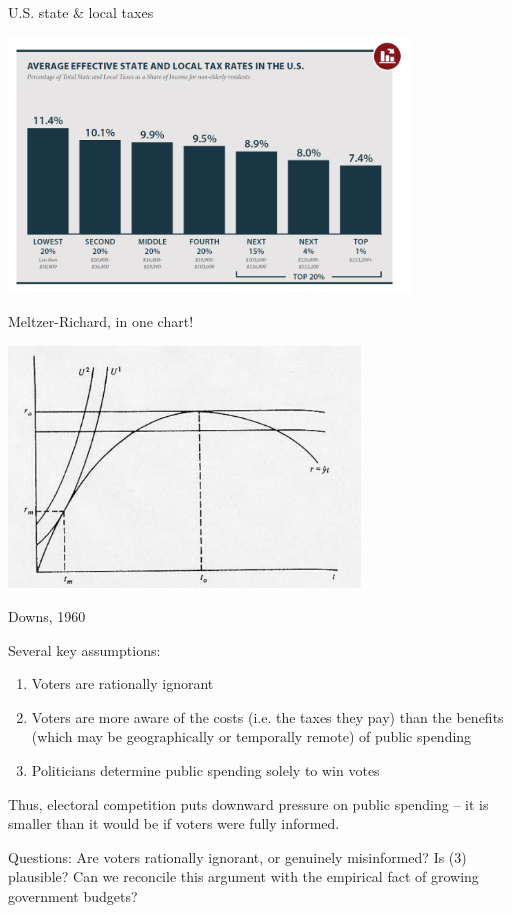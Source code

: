 \documentclass[aspectratio=169]{beamer}
\begin{document}
\begin{frame}{U.S. state \& local taxes}


\centering
\includegraphics[width=0.8\textwidth]{local_taxes.png}

\end{frame}
\begin{frame}{Meltzer-Richard, in one chart!}


\centering
\includegraphics[width=0.7\textwidth]{mr.png}

\end{frame}
\begin{frame}{Downs, 1960}

Several key assumptions:
\begin{enumerate}
\item Voters are \alert{rationally ignorant}
\pause 
\item Voters are more aware of the costs (i.e. the taxes they pay) than the benefits (which may be geographically or temporally remote) of public spending
\pause 
\item Politicians determine public spending solely to win votes
\end{enumerate}

\pause

Thus, electoral competition puts downward pressure on public spending -- it is smaller than it would be if voters were fully informed.

\pause

\begin{tcolorbox}
Questions: Are voters rationally ignorant, or genuinely misinformed? Is (3) plausible? Can we reconcile this argument with the empirical fact of growing government budgets?
\end{tcolorbox}

\end{frame}
\end{document}
